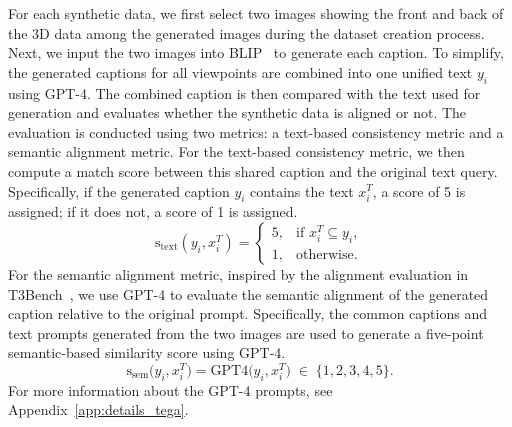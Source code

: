 For each synthetic data, we first select two images showing the front and back of the 3D data among the generated images during the dataset creation process. 
Next, we input the two images into BLIP~\cite{li2023blip} to generate each caption.
To simplify, the generated captions for all viewpoints are combined into one unified text  $y_i$ using GPT-4.
The combined caption is then compared with the text used for generation and evaluates whether the synthetic data is aligned or not. The evaluation is conducted using two metrics: a text-based consistency metric and a semantic alignment metric. 
For the text-based consistency metric, we then compute a match score between this shared caption and the original text query. 
Specifically, if the generated caption $y_i$ contains the text $x_{i}^{T}$, a score of 5 is assigned; if it does not, a score of 1 is assigned.
\begin{equation}
\label{eq:text-based-consistency}
\text{s}_{\text{text}}(y_i, x_{i}^{T})
=
\begin{cases}
5, & \text{if } x_{i}^{T} \subseteq y_i, \\
1, & \text{otherwise}.
\end{cases}
\end{equation}
For the semantic alignment metric, inspired by the alignment evaluation in T3Bench~\cite{he2023t}, we use GPT-4 to evaluate the semantic alignment of the generated caption relative to the original prompt. 
Specifically, the common captions and text prompts generated from the two images are used to generate a five-point semantic-based similarity score using GPT-4. 
\begin{equation}
\label{eq:semantic-alignment}
\text{s}_{\text{sem}}\bigl(y_i, x_{i}^{T}\bigr)
=
\mathrm{GPT4}\bigl(y_i, x_{i}^{T}\bigr)
\;\in\;\{1, 2, 3, 4, 5\}.
\end{equation}
For more information about the GPT-4 prompts, see Appendix~\ref{app:details_tega}.

